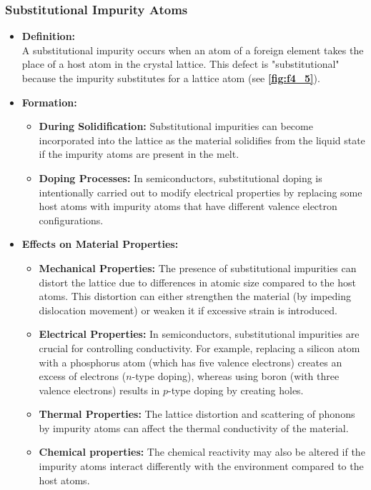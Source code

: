 \subsubsection{Substitutional Impurity Atoms} \label{sec:substitutional}
\begin{itemize}
  \item \textbf{Definition:} \\
    A substitutional impurity occurs when an atom of a foreign element takes the place of a host atom in the crystal lattice. This defect is "substitutional" because the impurity substitutes for a lattice atom (see \textbf{\autoref{fig:f4_5}}).
  \item \textbf{Formation:}
    \begin{itemize}
      \item \textbf{During Solidification:} Substitutional impurities can become incorporated into the lattice as the material solidifies from the liquid state if the impurity atoms are present in the melt.
      \item \textbf{Doping Processes:} In semiconductors, substitutional doping is intentionally carried out to modify electrical properties by replacing some host atoms with impurity atoms that have different valence electron configurations.
    \end{itemize}
  \item \textbf{Effects on Material Properties:}
    \begin{itemize}
      \item \textbf{Mechanical Properties:} The presence of substitutional impurities can distort the lattice due to differences in atomic size compared to the host atoms. This distortion can either strengthen the material (by impeding dislocation movement) or weaken it if excessive strain is introduced.
      \item \textbf{Electrical Properties:} In semiconductors, substitutional impurities are crucial for controlling conductivity. For example, replacing a silicon atom with a phosphorus atom (which has five valence electrons) creates an excess of electrons ($n$-type doping), whereas using boron (with three valence electrons) results in $p$-type doping by creating holes.
      \item \textbf{Thermal Properties:} The lattice distortion and scattering of phonons by impurity atoms can affect the thermal conductivity of the material.
      \item \textbf{Chemical properties:} The chemical reactivity may also be altered if the impurity atoms interact differently with the environment compared to the host atoms.
    \end{itemize}
\end{itemize}
